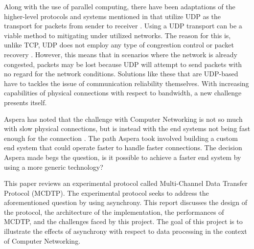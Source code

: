 Along with the use of parallel computing, there have been adaptations of the higher-level protocols and systems mentioned in \cite{Fan2010} that utilize UDP as the transport for packets from sender to receiver \cite{He2002}\cite{Fan2010}\cite{Aspera2016}\cite{Meiss2007}\cite{gu2007udt}. Using a UDP transport can be a viable method to mitigating under utilized networks. The reason for this is, unlike TCP, UDP does not employ any type of congrestion control or packet recovery \cite{postel1980user}. However, this means that in scenarios where the network is already congested, packets may be lost because UDP will attempt to send packets with no regard for the network conditions. Solutions like these that are UDP-based have to tackles the issue of communication reliability themselves. With increasing capabilities of physical connections with respect to bandwidth, a new challenge presents itself.

Aspera has noted that the challenge with Computer Networking is not so much with slow physical connections, but is instead with the end systems not being fast enough for the connection \cite{Fan2010}\cite{Aspera2016}. The path Aspera took involved building a custom end system that could operate faster to handle faster connections. The decision Aspera made begs the question, is it possible to achieve a faster end system by using a more generic technology?

This paper reviews an experimental protocol called Multi-Channel Data Transfer Protocol (MCDTP). The experimental protocol seeks to address the aforementioned question by using asynchrony. This report discusses the design of the protocol, the architecture of the implementation, the performances of MCDTP, and the challenges faced by this project. The goal of this project is to illustrate the effects of asynchrony with respect to data processing in the context of Computer Networking.
